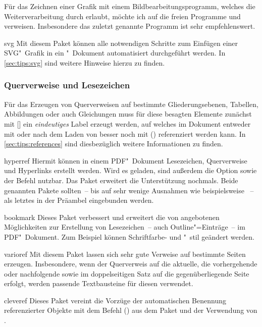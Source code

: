 Für das Zeichnen einer Grafik mit einem Bildbearbeitungsprogramm, welches die 
Weiterverarbeitung durch  erlaubt, möchte ich auf die freien 
Programme  und  verweisen. 
Insbesondere das zuletzt genannte Programm ist sehr empfehlenswert. 
%
\begin{packages}
\item[svg]
  Mit diesem Paket können alle notwendigen Schritte zum Einfügen einer 
  SVG"~Grafik in ein "~Dokument automatisiert durchgeführt 
  werden. In \autoref{sec:tips:svg} sind weitere Hinweise hierzu zu finden.
\end{packages}
%


\subsubsection{Querverweise und Lesezeichen}
%
%
%
Für das Erzeugen von Querverweisen auf bestimmte Gliederungsebenen, Tabellen, 
Abbildungen oder auch Gleichungen muss für diese besagten Elemente zunächst mit 
[] ein \emph{eindeutiges} Label erzeugt werden, 
auf welches im Dokument entweder mit  oder nach dem Laden von 
 besser noch mit () 
referenziert werden kann. In \autoref{sec:tips:references} sind diesbezüglich 
weitere Informationen zu finden.
%
\begin{packages}
\item[hyperref]
  Hiermit können in einem PDF"~Dokument Lesezeichen, Querverweise und 
  Hyperlinks erstellt werden. Wird es geladen, sind außerdem die Option 
   sowie der Befehl  nutzbar. Das 
  Paket  erweitert die Unterstützung nochmals. Beide 
  genannten Pakete sollten~-- bis auf sehr wenige Ausnahmen wie beispielsweise 
  ~-- als letztes in der Präambel eingebunden werden.
\item[bookmark]
  Dieses Paket verbessert und erweitert die von  angebotenen 
  Möglichkeiten zur Erstellung von Lesezeichen~-- auch Outline"=Einträge~-- im 
  PDF"~Dokument. Zum Beispiel können Schriftfarbe- und "~stil geändert werden.
\item[varioref]
  Mit diesem Paket lassen sich sehr gute Verweise auf bestimmte Seiten 
  erzeugen. Insbesondere, wenn der Querverweis auf die aktuelle, die 
  vorhergehende oder nachfolgende sowie im doppelseitigen Satz auf die 
  gegenüberliegende Seite erfolgt, werden passende Textbausteine für diesen 
  verwendet.
\item[cleveref]
  Dieses Paket vereint die Vorzüge der automatischen Benennung referenzierter 
  Objekte mit dem Befehl () aus dem Paket 
   und der Verwendung von .
\end{packages}
%
%


